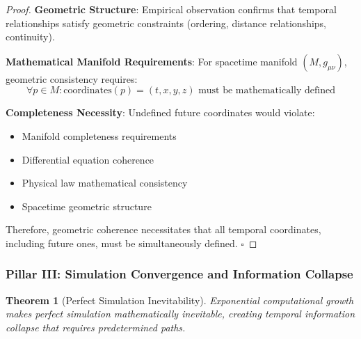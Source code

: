 \documentclass[11pt,a4paper]{article}
\newtheorem{theorem}{Theorem}[section]
\theoremstyle{remark}
\begin{document}
\begin{proof}
\textbf{Geometric Structure}: Empirical observation confirms that temporal relationships satisfy geometric constraints (ordering, distance relationships, continuity).

\textbf{Mathematical Manifold Requirements}: For spacetime manifold $(M, g_{\mu\nu})$, geometric consistency requires:
\begin{equation}
\forall p \in M: \text{coordinates}(p) = (t, x, y, z) \text{ must be mathematically defined}
\end{equation}

\textbf{Completeness Necessity}: Undefined future coordinates would violate:
\begin{itemize}
\item Manifold completeness requirements
\item Differential equation coherence  
\item Physical law mathematical consistency
\item Spacetime geometric structure
\end{itemize}

Therefore, geometric coherence necessitates that all temporal coordinates, including future ones, must be simultaneously defined. $\square$
\end{proof}

\subsubsection{Pillar III: Simulation Convergence and Information Collapse}

\begin{theorem}[Perfect Simulation Inevitability]
Exponential computational growth makes perfect simulation mathematically inevitable, creating temporal information collapse that requires predetermined paths.
\end{theorem}
\end{document}
